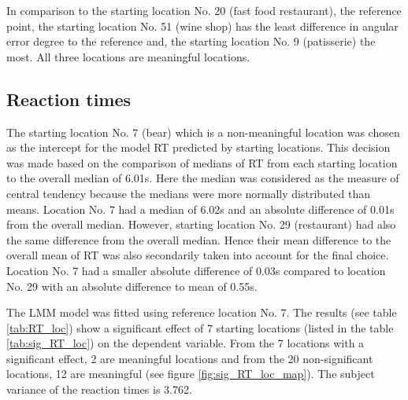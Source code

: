 In comparison to the starting location No. 20 (fast food restaurant), the reference point, the starting location No. 51 (wine shop) has the least difference in angular error degree to the reference and, the starting location No. 9 (patisserie) the most. All three locations are meaningful locations.

\subsection{Reaction times}

The starting location No. 7 (bear) which is a non-meaningful location was chosen as the intercept for the model RT predicted by starting locations. This decision was made based on the comparison of medians of RT from each starting location to the overall median of 6.01s. Here the median was considered as the measure of central tendency because the medians were more normally distributed than means. Location No. 7 had a median of 6.02s and an absolute difference of 0.01s from the overall median. However, starting location No. 29 (restaurant) had also the same difference from the overall median. Hence their mean difference to the overall mean of RT was also secondarily taken into account for the final choice. Location No. 7 had a smaller absolute difference of 0.03s compared to location No. 29 with an absolute difference to mean of 0.55s. 

The LMM model was fitted using reference location No. 7. The results (see table \ref{tab:RT_loc}) show a significant effect of 7 starting locations (listed in the table \ref{tab:sig_RT_loc}) on the dependent variable. From the 7 locations with a significant effect, 2 are meaningful locations and from the 20 non-significant locations, 12 are meaningful (see figure \ref{fig:sig_RT_loc_map}). The subject variance of the reaction times is 3.762.



